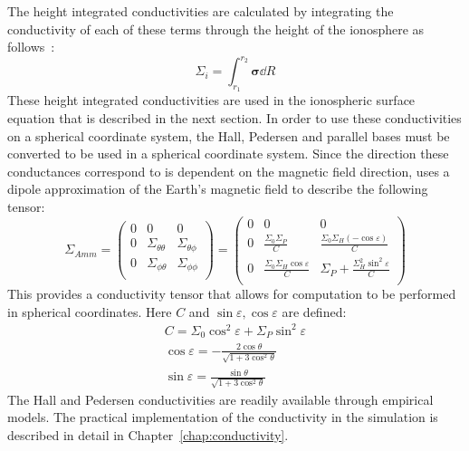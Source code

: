 The height integrated conductivities are calculated by integrating the conductivity of each of these terms through the height of the ionosphere as follows~\citep{goodman1995}:
\begin{equation*}
	\Sigma_i = \int_{r_1}^{r_2} \bm\sigma \dd{R}
\end{equation*}
These height integrated conductivities are used in the ionospheric surface equation that is described in the next section. In order to use these conductivities on a spherical coordinate system, the Hall, Pedersen and parallel bases must be converted to be used in a spherical coordinate system. Since the direction these conductances correspond to is dependent on the magnetic field direction, \citet{amm1996} uses a dipole approximation of the Earth's magnetic field to describe the following tensor:
\begin{equation}
	\Sigma_{Amm} = \begin{pmatrix}
		0 & 0                      & 0                   \\
		0 & \Sigma_{\theta \theta} & \Sigma_{\theta\phi} \\
		0 & \Sigma_{\phi \theta}   & \Sigma_{\phi\phi}   \\
	\end{pmatrix} =
	\begin{pmatrix}
		0 & 0                                          & 0                                                \\
		0 & \frac{\Sigma_0\Sigma_P}{C}                 & \frac{\Sigma_0\Sigma_H (-\cos\varepsilon)}{C}    \\
		0 & \frac{\Sigma_0\Sigma_H \cos\varepsilon}{C} & \Sigma_P + \frac{\Sigma_H^2\sin^2\varepsilon}{C} \\
	\end{pmatrix}
	\label{eq:conductivity_tensor}
\end{equation}
This provides a conductivity tensor that allows for computation to be performed in spherical coordinates. Here $C$ and $\sin\varepsilon, \cos\varepsilon$ are defined:
\begin{align*}
	C                = \Sigma_0\cos^2\varepsilon + \Sigma_P \sin^2\varepsilon \\
	\cos\varepsilon  = - \frac{2\cos\theta}{\sqrt{1+3\cos^2\theta}}           \\
	\sin\varepsilon  =  \frac{\sin\theta}{\sqrt{1+3\cos^2\theta}}
\end{align*}
The Hall and Pedersen conductivities are readily available through empirical models. The practical implementation of the conductivity in the simulation is described in detail in Chapter~\ref{chap:conductivity}.
